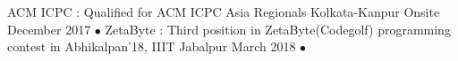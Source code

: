 \begin{cvhonors}
  \cvhonor
    {\small ACM ICPC : }
    {\small Qualified for ACM ICPC Asia Regionals Kolkata-Kanpur Onsite}
    {\small December 2017}
    {$\bullet$}
 \cvhonor
    {\small ZetaByte : }
    {\small Third position in ZetaByte(Codegolf) programming contest in Abhikalpan'18, IIIT Jabalpur}
    {\small March 2018}
    {$\bullet$}
\end{cvhonors}

